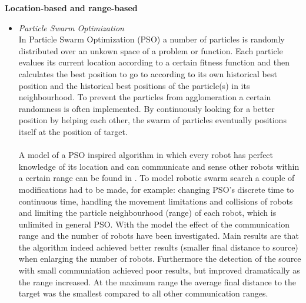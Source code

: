 	\textbf{Location-based and range-based}
	\begin{itemize}
		\item 
		\textit{Particle Swarm Optimization}\\
		In Particle Swarm Optimization (PSO) a number of particles is randomly distributed over an unkown space of a problem or function. 
		Each particle evalues its current location according to a certain fitness function and then calculates the best position to go to according to its own historical best position and the historical best positions of the particle(s) in its neighbourhood.
		To prevent the particles from agglomeration a certain randomness is often implemented. 
		By continuously looking for a better position by helping each other, the swarm of particles eventually positions itself at the position of target. \cite{poli2007particle}\\
		\\
		A model of a PSO inspired algorithm in which every robot has perfect knowledge of its location and can communicate and sense other robots within a certain range can be found in \cite{pugh2007inspiring}.
		To model robotic swarm search a couple of modifications had to be made, for example: changing PSO's discrete time to continuous time, handling the movement limitations and collisions of robots and limiting the particle neighbourhood (range) of each robot, which is unlimited in general PSO.
		With the model the effect of the communication range and the number of robots have been investigated.
		Main results are that the algorithm indeed achieved better results (smaller final distance to source) when enlarging the number of robots.
		Furthermore the detection of the source with small communiation achieved poor results, but improved dramatically as the range increased.
		At the maximum range the average final distance to the target was the smallest compared to all other communication ranges.


\end{itemize}
